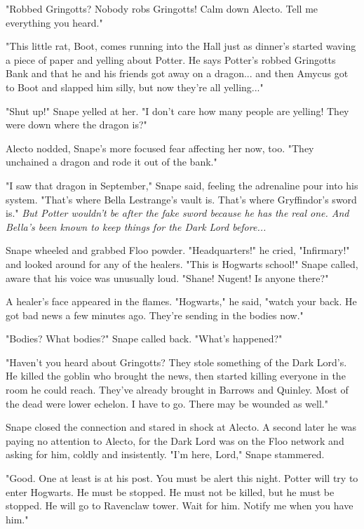 "Robbed Gringotts? Nobody robs Gringotts! Calm down Alecto. Tell me everything you heard."

"This little rat, Boot, comes running into the Hall just as dinner's started waving a piece of paper and yelling about Potter. He says Potter's robbed Gringotts Bank and that he and his friends got away on a dragon... and then Amycus got to Boot and slapped him silly, but now they're all yelling..."

"Shut up!" Snape yelled at her. "I don't care how many people are yelling! They were down where the dragon is?"

Alecto nodded, Snape's more focused fear affecting her now, too. "They unchained a dragon and rode it out of the bank."

"I saw that dragon in September," Snape said, feeling the adrenaline pour into his system. "That's where Bella Lestrange's vault is. That's where Gryffindor's sword is." \emph{But Potter wouldn't be after the fake sword because he has the real one. And Bella's been known to keep things for the Dark Lord before...}

Snape wheeled and grabbed Floo powder. "Headquarters!" he cried, "Infirmary!" and looked around for any of the healers. "This is Hogwarts school!" Snape called, aware that his voice was unusually loud. "Shane! Nugent! Is anyone there?"

A healer's face appeared in the flames. "Hogwarts," he said, "watch your back. He got bad news a few minutes ago. They're sending in the bodies now."

"Bodies? What bodies?" Snape called back. "What's happened?"

"Haven't you heard about Gringotts? They stole something of the Dark Lord's. He killed the goblin who brought the news, then started killing everyone in the room he could reach. They've already brought in Barrows and Quinley. Most of the dead were lower echelon. I have to go. There may be wounded as well."

Snape closed the connection and stared in shock at Alecto. A second later he was paying no attention to Alecto, for the Dark Lord was on the Floo network and asking for him, coldly and insistently. "I'm here, Lord," Snape stammered.

"Good. One at least is at his post. You must be alert this night. Potter will try to enter Hogwarts. He must be stopped. He must not be killed, but he must be stopped. He will go to Ravenclaw tower. Wait for him. Notify me when you have him."

